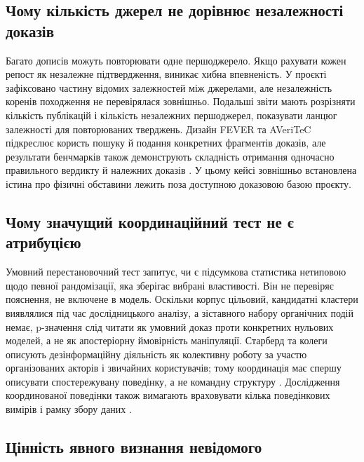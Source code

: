\subsection{Чому кількість джерел не дорівнює незалежності доказів}

Багато дописів можуть повторювати одне першоджерело. Якщо рахувати кожен репост як незалежне підтвердження, виникає хибна впевненість. У проєкті зафіксовано частину відомих залежностей між джерелами, але незалежність коренів походження не перевірялася зовнішньо. Подальші звіти мають розрізняти кількість публікацій і кількість незалежних першоджерел, показувати ланцюг залежності для повторюваних тверджень. Дизайн FEVER та AVeriTeC підкреслює користь пошуку й подання конкретних фрагментів доказів, але результати бенчмарків також демонструють складність отримання одночасно правильного вердикту й належних доказів \citep{thorne2018fever,schlichtkrull2023averitec,schlichtkrull2024averitecshared}. У цьому кейсі зовнішньо встановлена істина про фізичні обставини лежить поза доступною доказовою базою проєкту.

\subsection{Чому значущий координаційний тест не є атрибуцією}

Умовний перестановочний тест запитує, чи є підсумкова статистика нетиповою щодо певної рандомізації, яка зберігає вибрані властивості. Він не перевіряє пояснення, не включене в модель. Оскільки корпус цільовий, кандидатні кластери виявлялися під час дослідницького аналізу, а зіставного набору органічних подій немає, p-значення слід читати як умовний доказ проти конкретних нульових моделей, а не як апостеріорну ймовірність маніпуляції. Старберд та колеги описують дезінформаційну діяльність як колективну роботу за участю організованих акторів і звичайних користувачів; тому координація має спершу описувати спостережувану поведінку, а не командну структуру \citep{starbird2019collaborative}. Дослідження координованої поведінки також вимагають враховувати кілька поведінкових вимірів і рамку збору даних \citep{pacheco2021uncovering,nizzoli2021coordinated,magelinski2022synchronized,ng2023combined}.

\subsection{Цінність явного визнання невідомого}

